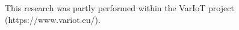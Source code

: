 \documentclass[aic]{iosart2x}
\begin{document}
This research was partly performed within the VarIoT project (https://www.variot.eu/).





\end{document}
